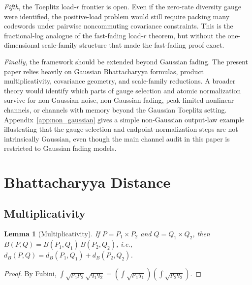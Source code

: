 \documentclass[lettersize,onecolumn]{IEEEtran}
\newtheorem{lemma}{Lemma}
\begin{document}
\emph{Fifth}, the Toeplitz load-$r$ frontier is open. Even if the
zero-rate diversity gauge were identified, the positive-load problem
would still require packing many codewords under pairwise
noncommuting covariance constraints. This is the fractional-log
analogue of the fast-fading load-$r$ theorem, but without the
one-dimensional scale-family structure that made the fast-fading proof
exact.

\emph{Finally}, the framework should be extended beyond Gaussian
fading. The present paper relies heavily on Gaussian Bhattacharyya
formulas, product multiplicativity, covariance geometry, and
scale-family reductions. A broader theory would identify which parts
of gauge selection and atomic normalization survive for non-Gaussian
noise, non-Gaussian fading, peak-limited nonlinear channels, or
channels with memory beyond the Gaussian Toeplitz setting.
Appendix~\ref{app:non_gaussian} gives a simple non-Gaussian output-law example illustrating that the gauge-selection and endpoint-normalization steps are not intrinsically Gaussian, even though the main channel audit in this paper is restricted to Gaussian fading models.

\appendices
{}

\section{Bhattacharyya Distance}\label{app:bhatt}

\subsection{Multiplicativity}

\begin{lemma}[Multiplicativity]\label{lem:mult}
If $P = P_1 \times P_2$ and $Q = Q_1 \times Q_2$, then
$B(P,Q) = B(P_1,Q_1)\,B(P_2,Q_2)$, i.e.,
$d_B(P,Q) = d_B(P_1,Q_1) + d_B(P_2,Q_2)$.
\end{lemma}
\begin{proof}
By Fubini,
$\int\sqrt{p_1 p_2}\sqrt{q_1 q_2}
= (\int\sqrt{p_1 q_1})(\int\sqrt{p_2 q_2})$.
\end{proof}
\end{document}

